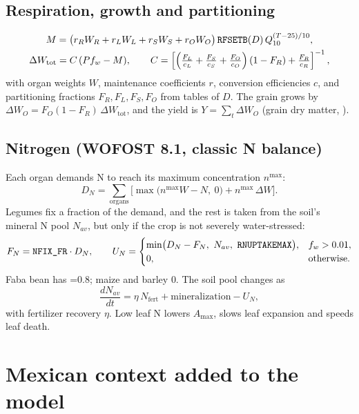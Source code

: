 \documentclass[11pt,a4paper]{article}
\newcommand{\code}[1]{\texttt{\detokenize{#1}}}
\begin{document}
\subsection{Respiration, growth and partitioning}
\begin{gather}
  M = \big(r_R W_R + r_L W_L + r_S W_S + r_O W_O\big)\,\code{RFSETB}(D)\, Q_{10}^{(T - 25)/10},\\
  \Delta W_{\mathrm{tot}} = C\,(P f_w - M),\qquad
  C = \left[\left(\tfrac{F_L}{c_L} + \tfrac{F_S}{c_S} + \tfrac{F_O}{c_O}\right)(1 - F_R) + \tfrac{F_R}{c_R}\right]^{-1},
\end{gather}
with organ weights \(W\), maintenance coefficients \(r\), conversion efficiencies \(c\), and partitioning fractions
\(F_R, F_L, F_S, F_O\) from tables of \(D\). The grain grows by \(\Delta W_O = F_O (1 - F_R)\,\Delta W_{\mathrm{tot}}\),
and the yield is \(Y = \sum_t \Delta W_O\) (grain dry matter, \code{TWSO}).

\subsection{Nitrogen (WOFOST 8.1, classic N balance)}
Each organ demands N to reach its maximum concentration \(n^{\max}\):
\begin{equation}
  D_N = \sum_{\text{organs}} \Big[\max\big(n^{\max} W - N,\ 0\big) + n^{\max}\,\Delta W\Big].
\end{equation}
Legumes fix a fraction of the demand, and the rest is taken from the soil's mineral N pool \(N_{av}\), but only if
the crop is not severely water-stressed:
\begin{equation}
  F_N = \code{NFIX_FR}\cdot D_N,\qquad
  U_N = \begin{cases} \min\!\big(D_N - F_N,\ N_{av},\ \code{RNUPTAKEMAX}\big), & f_w > 0.01,\\ 0, & \text{otherwise.}\end{cases}
\end{equation}
Faba bean has \code{NFIX_FR}=0.8; maize and barley 0. The soil pool changes as
\begin{equation}
  \frac{dN_{av}}{dt} = \eta\,N_{\mathrm{fert}} + \text{mineralization} - U_N,
\end{equation}
with fertilizer recovery \(\eta\). Low leaf N lowers \(A_{\max}\), slows leaf expansion and speeds leaf death.

\section{Mexican context added to the model}\label{sec:mexico}
\end{document}

